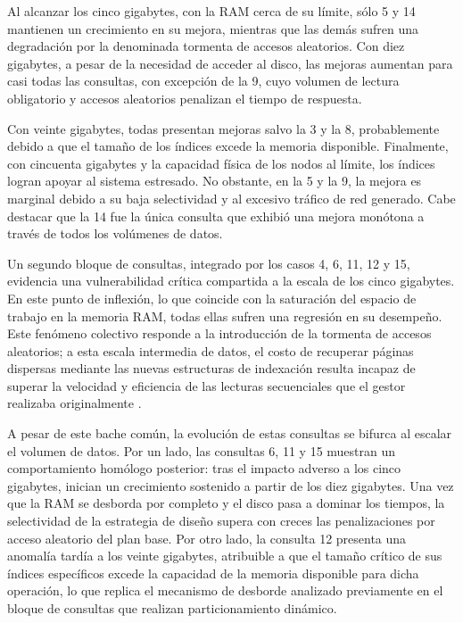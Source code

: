 \documentclass[12pt, letter paper]{report}
\begin{document}
        Al alcanzar los cinco gigabytes, con la RAM cerca de su límite, sólo 5 y
        14 mantienen un crecimiento en su mejora, mientras que las demás sufren
        una degradación por la denominada tormenta de accesos aleatorios.
        Con diez gigabytes, a pesar de la necesidad de acceder al disco, las
        mejoras aumentan para casi todas las consultas, con excepción de la 9,
        cuyo volumen de lectura obligatorio y accesos aleatorios penalizan el
        tiempo de respuesta.

        Con veinte gigabytes, todas presentan mejoras salvo la 3 y la 8,
        probablemente debido a que el tamaño de los índices excede la memoria
        disponible. Finalmente, con cincuenta gigabytes y la capacidad física de
        los nodos al límite, los índices logran apoyar al sistema estresado. No
        obstante, en la 5 y la 9, la mejora es marginal debido a su baja
        selectividad y al excesivo tráfico de red generado. Cabe destacar que la
        14 fue la única consulta que exhibió una mejora monótona a través de
        todos los volúmenes de datos.

        Un segundo bloque de consultas, integrado por los casos 4, 6, 11, 12 y
        15, evidencia una vulnerabilidad crítica compartida a la escala de los
        cinco gigabytes. En este punto de inflexión, lo que coincide con la
        saturación del espacio de trabajo en la memoria RAM, todas ellas sufren
        una regresión en su desempeño. Este fenómeno colectivo responde a la 
        introducción de la tormenta de accesos aleatorios; a esta escala
        intermedia de datos, el costo de recuperar páginas dispersas mediante
        las nuevas estructuras de indexación resulta incapaz de superar la
        velocidad y eficiencia de las lecturas secuenciales que el gestor
        realizaba originalmente \cite{graefe1993query}.

        A pesar de este bache común, la evolución de estas consultas se bifurca
        al escalar el volumen de datos. Por un lado, las consultas 6, 11 y 15
        muestran un comportamiento homólogo posterior: tras el impacto adverso a
        los cinco gigabytes, inician un crecimiento sostenido a partir de los
        diez gigabytes. Una vez que la RAM se desborda por completo y el disco
        pasa a dominar los tiempos, la selectividad de la estrategia de diseño
        supera con creces las penalizaciones por acceso aleatorio del plan base.
        Por otro lado, la consulta 12 presenta una anomalía tardía a los veinte
        gigabytes, atribuible a que el tamaño crítico de sus índices específicos
        excede la capacidad de la memoria disponible para dicha operación, lo
        que replica el mecanismo de desborde analizado previamente en el bloque
        de consultas que realizan particionamiento dinámico.
\end{document}
